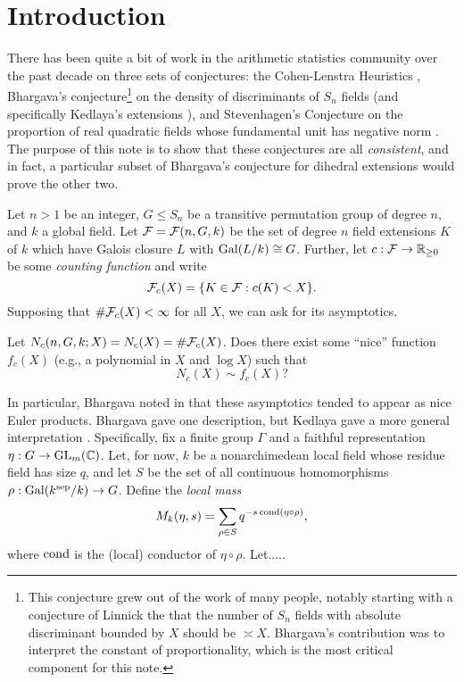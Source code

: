 \section{Introduction}\label{sec:introduction}

There has been quite a bit of work in the arithmetic statistics community over
the past decade on three sets of conjectures: the Cohen-Lenstra Heuristics
\cite{CohenLenstra}, Bhargava's conjecture\footnote{This conjecture grew out of
the work of many people, notably starting with a conjecture of Linnick
\cite{Linnick} the that the number of $S_n$ fields with absolute discriminant
bounded by $X$ should be $\asymp X$. Bhargava's contribution was to interpret
the constant of proportionality, which is the most critical component for this
note.} on the density of discriminants of $S_n$ fields \cite{bhargavamass} (and
specifically Kedlaya's extensions \cite{kedlayamass}), and Stevenhagen's
Conjecture on the proportion of real quadratic fields whose fundamental unit
has negative norm \cite{Stevenhagen}. The purpose of this note is to show that
these conjectures are all {\em consistent}, and in fact, a particular subset of
Bhargava's conjecture for dihedral extensions would prove the other two.

Let $n > 1$ be an integer, $G \leq S_n$ be a transitive permutation group of
degree $n$, and $k$ a global field. Let $\mathcal{F} = \mathcal{F}(n, G, k)$ be the set of
degree $n$ field extensions $K$ of $k$ which have Galois closure $L$ with
$\operatorname{Gal}(L/k) \cong G$. Further, let $c: \mathcal{F} \to \mathbb{R}_{\geq 0}$ be some {\em
counting function} and write \[ \mathcal{F}_c(X) = \{ K \in \mathcal{F} : c(K) < X \}. \]
Supposing that $\# \mathcal{F}_c(X) < \infty$ for all $X$, we can ask for its
asymptotics.

\begin{question}
  Let $N_c(n, G, k; X) = N_c(X) = \# \mathcal{F}_c(X)$. Does there exist some ``nice''
  function $f_c(X)$ (e.g., a polynomial in $X$ and $\log X$) such that \[ N_c(X) \sim f_c(X)? \]
\end{question}

In particular, Bhargava noted in \cite{bhargavamass} that these asymptotics
tended to appear as nice Euler products. Bhargava gave one description, but
Kedlaya gave a more general interpretation \cite{kedlayamass}. Specifically,
fix a finite group $\Gamma$ and a faithful representation $\eta: G \to
\operatorname{GL}_m(\mathbb{C})$. Let, for now, $k$ be a nonarchimedean local field whose residue
field has size $q$, and let $S$ be the set of all continuous homomorphisms
$\rho : \operatorname{Gal}(k^{\mathrm{sep}}/k) \to G$. Define the {\em local mass} \[ M_k(\eta, s) =
\sum_{\rho \in S} q^{-s\operatorname{cond}(\eta \circ \rho)}, \] where $\operatorname{cond}$ is the (local)
conductor of $\eta \circ \rho$. Let.....

